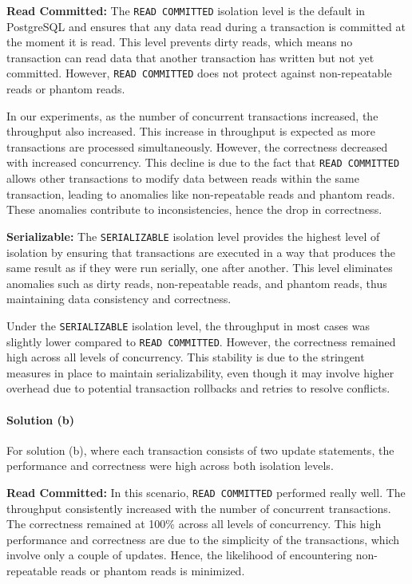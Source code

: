\documentclass[11pt]{scrartcl}
\begin{document}
\textbf{Read Committed:}
The \lstinline[style=dbtsql]{READ COMMITTED} isolation level is the default in PostgreSQL \cite{PostgreSQL2021IsolationLevel}
and ensures that any data read during a transaction is committed at the moment it is read.
This level prevents dirty reads, which means no transaction can read data that another transaction has written but not yet committed.
However, \lstinline[style=dbtsql]{READ COMMITTED} does not protect against non-repeatable reads or phantom reads.

In our experiments, as the number of concurrent transactions increased, the throughput also increased.
This increase in throughput is expected as more transactions are processed simultaneously.
However, the correctness decreased with increased concurrency.
This decline is due to the fact that \lstinline[style=dbtsql]{READ COMMITTED} allows other transactions to modify data between reads within the same transaction,
leading to anomalies like non-repeatable reads and phantom reads.
These anomalies contribute to inconsistencies, hence the drop in correctness.

\textbf{Serializable:}
The \lstinline[style=dbtsql]{SERIALIZABLE} isolation level provides the highest level of isolation by ensuring that transactions are executed in a way that produces the same result as if they were run serially, one after another.
This level eliminates anomalies such as dirty reads, non-repeatable reads, and phantom reads, thus maintaining data consistency and correctness.

Under the \lstinline[style=dbtsql]{SERIALIZABLE} isolation level, the throughput in most cases was slightly lower compared to \lstinline[style=dbtsql]{READ COMMITTED}.
However, the correctness remained high across all levels of concurrency.
This stability is due to the stringent measures in place to maintain serializability, even though it may involve higher
overhead due to potential transaction rollbacks and retries to resolve conflicts.

\paragraph{Solution (b)}

For solution (b), where each transaction consists of two update statements, the performance and correctness were high across both isolation levels.

\textbf{Read Committed:}
In this scenario, \lstinline[style=dbtsql]{READ COMMITTED} performed really well.
The throughput consistently increased with the number of concurrent transactions.
The correctness remained at 100\% across all levels of concurrency.
This high performance and correctness are due to the simplicity of the transactions, which involve only a couple of updates.
Hence, the likelihood of encountering non-repeatable reads or phantom reads is minimized.
\end{document}
